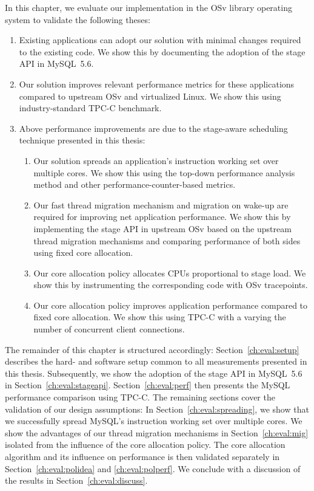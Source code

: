 \documentclass[12pt,a4paper]{book}
\begin{document}
In this chapter, we evaluate our implementation in the OSv library operating system to validate the following theses:
\begin{enumerate}
    \item Existing applications can adopt our solution with minimal changes required to the existing code.
        We show this by documenting the adoption of the stage API in MySQL~5.6.
    \item Our solution improves relevant performance metrics for these applications compared to upstream OSv and virtualized Linux.
        We show this using industry-standard TPC-C benchmark.
    \item Above performance improvements are due to the stage-aware scheduling technique presented in this thesis:
    \begin{enumerate}
        \item Our solution spreads an application's instruction working set over multiple cores.
            We show this using the top-down performance analysis method and other performance-counter-based metrics.
        \item Our fast thread migration mechanism and migration on wake-up are required for improving net application performance.
            We show this by implementing the stage API in upstream OSv based on the upstream thread migration mechanisms and comparing performance of both sides using fixed core allocation.
        \item Our core allocation policy allocates CPUs proportional to stage load.
            We show this by instrumenting the corresponding code with OSv tracepoints.
        \item Our core allocation policy improves application performance compared to fixed core allocation.
            We show this using TPC-C with a varying the number of concurrent client connections.
    \end{enumerate}
\end{enumerate}

The remainder of this chapter is structured accordingly:
Section~\ref{ch:eval:setup} describes the hard- and software setup common to all measurements presented in this thesis.
Subsequently, we show the adoption of the stage API in MySQL~5.6 in Section~\ref{ch:eval:stageapi}.
Section~\ref{ch:eval:perf} then presents the MySQL performance comparison using TPC-C.
The remaining sections cover the validation of our design assumptions:
In Section~\ref{ch:eval:spreading}, we show that we successfully spread MySQL's instruction working set over multiple cores.
We show the advantages of our thread migration mechanisms in Section~\ref{ch:eval:mig} isolated from the influence of the core allocation policy.
The core allocation algorithm and its influence on performance is then validated separately in Section~\ref{ch:eval:polidea} and \ref{ch:eval:polperf}.
We conclude with a discussion of the results in Section~\ref{ch:eval:discuss}.
\end{document}
